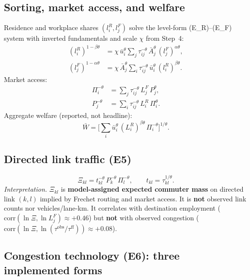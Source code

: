 \documentclass[12pt]{article}
\newcommand{\Wbar}{\bar W}
\newcommand{\ubar}{\bar u}
\newcommand{\Abar}{\bar A}
\newcommand{\obs}{\mathrm{obs}}
\newcommand{\ff}{\mathrm{ff}}
\newcommand{\corr}{\mathrm{corr}}
\begin{document}
\subsection{Sorting, market access, and welfare}

Residence and workplace shares $(l_i^R,l_j^F)$ solve the level-form
(E\_R)--(E\_F) system with inverted fundamentals and scale $\chi$ from Step~4:
\begin{align}
  (l_i^R)^{1-\beta\theta} &= \chi\,\ubar_i^{\theta}\sum_j \tau_{ij}^{-\theta}\,
    \Abar_j^{\theta}\,(l_j^F)^{\alpha\theta}, \label{eq:ER}\\
  (l_j^F)^{1-\alpha\theta} &= \chi\,\Abar_j^{\theta}\sum_i \tau_{ij}^{-\theta}\,
    \ubar_i^{\theta}\,(l_i^R)^{\beta\theta}. \label{eq:EF}
\end{align}
Market access:
\begin{align}
  \Pi_i^{-\theta} &= \sum_j \tau_{ij}^{-\theta}\,L_j^F\,P_j^{\theta},
    \label{eq:Pi}\\
  P_j^{-\theta}   &= \sum_i \tau_{ij}^{-\theta}\,L_i^R\,\Pi_i^{\theta}.
    \label{eq:P}
\end{align}
Aggregate welfare (reported, not headline):
\begin{equation}
  \Wbar = \Big[\sum_i \ubar_i^{\theta}\,(L_i^R)^{\beta\theta}\,
    \Pi_i^{-\theta}\Big]^{1/\theta}.
\end{equation}

\subsection{Directed link traffic (E5)}

\begin{equation}
  \Xi_{kl} = t_{kl}^{-\theta}\,P_k^{-\theta}\,\Pi_l^{-\theta},
  \qquad t_{kl} = \tau_{kl}^{1/\theta}.
  \label{eq:E5}
\end{equation}
\emph{Interpretation.} $\Xi_{kl}$ is \textbf{model-assigned expected commuter
mass} on directed link $(k,l)$ implied by Frechet routing and market access.
It is \textbf{not} observed link counts nor vehicles/lane-km.
It correlates with destination employment ($\corr(\ln\Xi,\ln L^F_j)\approx +0.46$)
but \textbf{not} with observed congestion ($\corr(\ln\Xi,\ln(\tau^{\obs}/\tau^{\ff}))\approx +0.08$).

\subsection{Congestion technology (E6): three implemented forms}\label{sec:anchored}
\end{document}
